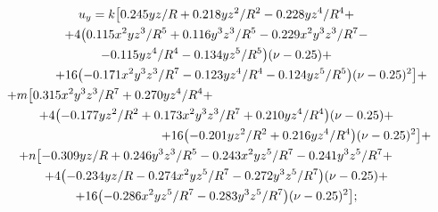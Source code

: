 \vspace{-5mm}



\begin{multline}\label{eq:ulg:ppr2}

u_y=k\bigl[0.245 y z/R+0.218 y z^2/R^2-0.228 y z^4/R^4+

\\ + 4\bigl(0.115 x^2 y z^3/R^5+ 0.116 y^3 z^3/R^5-0.229x^2 y^3 z^3/R^7 - 

\\

-0.115 y z^4/R^4-0.134 y z^5/R^5\bigr) (\nu-0.25)+\\

\hspace{1.4cm}

+16\bigl(-0.171 x^2 y^3 z^3/R^7-0.123 y z^4/R^4-0.124 y z^5/R^5\bigr) (\nu -0.25)^2\bigr]+

\\

+m\bigl[ 0.315 x^2 y^3 z^3/R^7+0.270 y z^4/R^4+ \hspace{6cm}

\\ +4\bigl(-0.177 y z^2/R^2+0.173 x^2 y^3 z^3/R^7 +0.210y z^4/R^4\bigr) (\nu -0.25)+ \\

\hspace{4.5cm}

+ 16 \bigl(-0.201 y z^2/R^2+0.216 y z^4/R^4\bigr)(\nu -0.25)^2\bigr]+ 

\\

+n\bigl[-0.309 y z/R+0.246 y^3 z^3/R^5-0.243 x^2 y z^5/R^7-0.241y^3 z^5/R^7+ \hspace{.6cm}\\

+4 \bigl(-0.234y z/R-0.274 x^2 y z^5/R^7-0.272 y^3 z^5/R^7\bigr) (\nu -0.25)+\\

+16\bigl(-0.286x^2 y z^5/R^7-0.283 y^3 z^5/R^7\bigr) (\nu -0.25)^2\bigr];

\end{multline}



\vspace{-5mm}



